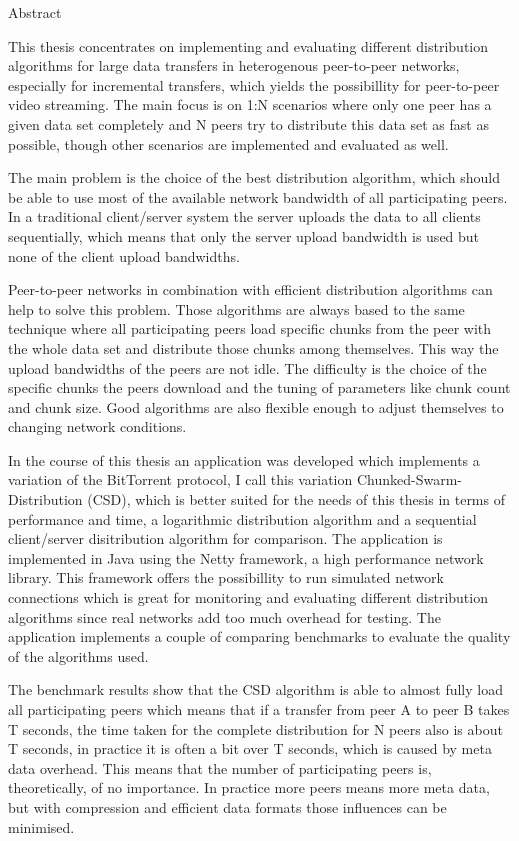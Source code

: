 \begin{center} 
\huge Abstract
\end{center}


This thesis concentrates on implementing and evaluating different distribution algorithms for large data transfers in heterogenous peer-to-peer networks, especially for incremental transfers, which yields the possibillity for peer-to-peer video streaming. The main focus is on 1:N scenarios where only one peer has a given data set completely and N peers try to distribute this data set as fast as possible, though other scenarios are implemented and evaluated as well.

The main problem is the choice of the best distribution algorithm, which should be able to use most of the available network bandwidth of all participating peers. In a traditional client/server system the server uploads the data to all clients sequentially, which means that only the server upload bandwidth is used but none of the client upload bandwidths.

Peer-to-peer networks in combination with efficient distribution algorithms can help to solve this problem. Those algorithms are always based to the same technique where all participating peers load specific chunks from the peer with the whole data set and distribute those chunks among themselves. This way the upload bandwidths of the peers are not idle. The difficulty is the choice of the specific chunks the peers download and the tuning of parameters like chunk count and chunk size. Good algorithms are also flexible enough to adjust themselves to changing network conditions.

In the course of this thesis an application was developed which implements a variation of the BitTorrent protocol, I call this variation Chunked-Swarm-Distribution (CSD), which is better suited for the needs of this thesis in terms of performance and time, a logarithmic distribution algorithm and a sequential client/server disitribution algorithm for comparison. The application is implemented in Java using the Netty framework, a high performance network library. This framework offers the possibillity to run simulated network connections which is great for monitoring and evaluating different distribution algorithms since real networks add too much overhead for testing. The application implements a couple of comparing benchmarks to evaluate the quality of the algorithms used.

The benchmark results show that the CSD algorithm is able to almost fully load all participating peers which means that if a transfer from peer A to peer B takes T seconds, the time taken for the complete distribution for N peers also is about T seconds, in practice it is often a bit over T seconds, which is caused by meta data overhead. This means that the number of participating peers is, theoretically, of no importance. In practice more peers means more meta data, but with compression and efficient data formats those influences can be minimised.
